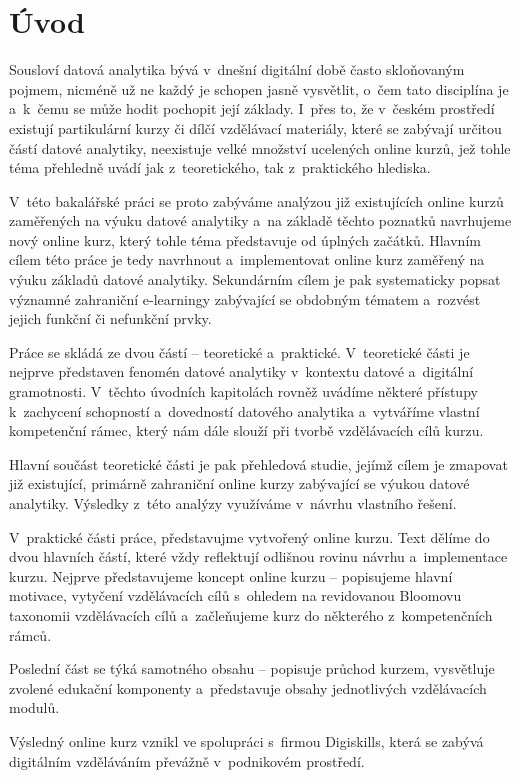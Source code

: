 \hypertarget{uxfavod}{%
\chapter*{Úvod}\label{uvod}}

Sousloví datová analytika bývá v~dnešní digitální době často skloňovaným pojmem, nicméně už ne každý je schopen jasně vysvětlit, o~čem tato disciplína je a~k~čemu se může hodit pochopit její základy. I~přes to, že v~českém prostředí existují partikulární kurzy či dílčí vzdělávací materiály, které se zabývají určitou částí datové analytiky, neexistuje velké množství ucelených online kurzů, jež tohle téma přehledně uvádí jak z~teoretického, tak z~praktického hlediska.

V~této bakalářské práci se proto zabýváme analýzou již existujících online kurzů zaměřených na výuku datové analytiky a~na základě těchto poznatků navrhujeme nový online kurz, který tohle téma představuje od úplných začátků. Hlavním cílem této práce je tedy navrhnout a~implementovat online kurz zaměřený na výuku základů datové analytiky. Sekundárním cílem je pak systematicky popsat významné zahraniční e-learningy zabývající se obdobným tématem a~rozvést jejich funkční či nefunkční prvky.

Práce se skládá ze dvou částí -- teoretické a~praktické. V~teoretické části je nejprve představen fenomén datové analytiky v~kontextu datové a~digitální gramotnosti. V~těchto úvodních kapitolách rovněž uvádíme některé přístupy k~zachycení schopností a~dovedností datového analytika a~vytváříme vlastní kompetenční rámec, který nám dále slouží při tvorbě vzdělávacích cílů kurzu.

Hlavní součást teoretické části je pak přehledová studie, jejímž cílem je zmapovat již existující, primárně zahraniční online kurzy zabývající se výukou datové analytiky. Výsledky z~této analýzy využíváme v~návrhu vlastního řešení.

V~praktické části práce, představujme vytvořený online kurzu. Text dělíme do dvou hlavních částí, které vždy reflektují odlišnou rovinu návrhu a~implementace kurzu. Nejprve představujeme koncept online kurzu -- popisujeme hlavní motivace, vytyčení vzdělávacích cílů s~ohledem na revidovanou Bloomovu taxonomii vzdělávacích cílů a~začleňujeme kurz do některého z~kompetenčních rámců.

Poslední část se týká samotného obsahu -- popisuje průchod kurzem, vysvětluje zvolené edukační komponenty a~představuje obsahy jednotlivých vzdělávacích modulů.

Výsledný online kurz vznikl ve spolupráci s~firmou Digiskills, která se zabývá digitálním vzděláváním převážně v~podnikovém prostředí.
